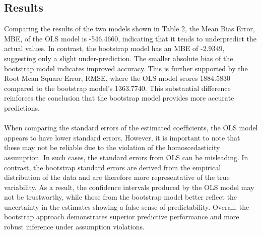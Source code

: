 \subsection{Results}
Comparing the results of the two models shown in Table 2, the Mean Bias Error, MBE, of the OLS model is -546.4660, indicating that it tends to underpredict the actual values. In contrast, the bootstrap model has an MBE of -2.9349, suggesting only a slight under-prediction. The smaller absolute bias of the bootstrap model indicates improved accuracy. This is further supported by the Root Mean Square Error, RMSE, where the OLS model scores 1884.5830 compared to the bootstrap model’s 1363.7740. This substantial difference reinforces the conclusion that the bootstrap model provides more accurate predictions.
\\\\
When comparing the standard errors of the estimated coefficients, the OLS model appears to have lower standard errors. However, it is important to note that these may not be reliable due to the violation of the homoscedasticity assumption. In such cases, the standard errors from OLS can be misleading. In contrast, the bootstrap standard errors are derived from the empirical distribution of the data and are therefore more representative of the true variability. As a result, the confidence intervals produced by the OLS model may not be trustworthy, while those from the bootstrap model better reflect the uncertainty in the estimates showing a false sense of predictability. Overall, the bootstrap approach demonstrates superior predictive performance and more robust inference under assumption violations.
\\




